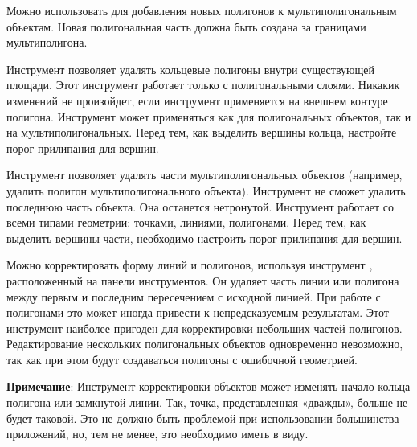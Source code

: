 
Можно использовать 
для добавления новых полигонов к мультиполигональным объектам. Новая
полигональная часть должна быть создана за границами мультиполигона.



Инструмент  позволяет удалять
кольцевые полигоны внутри существующей площади. Этот инструмент работает
только с полигональными слоями. Никакик изменений не произойдет, если
инструмент применяется на внешнем контуре полигона. Инструмент может
применяться как для полигональных объектов, так и на мультиполигональных.
Перед тем, как выделить вершины кольца, настройте порог прилипания для вершин.



Инструмент  позволяет удалять
части мультиполигональных объектов (например, удалить полигон
мультиполигонального объекта). Инструмент не сможет удалить последнюю часть
объекта. Она останется нетронутой. Инструмент работает со всеми типами
геометрии: точками, линиями, полигонами. Перед тем, как выделить вершины
части, необходимо настроить порог прилипания для вершин.


Можно корректировать форму линий и полигонов, используя инструмент
, расположенный на
панели инструментов. Он удаляет часть линии или полигона между первым и
последним пересечением с исходной линией. При работе с полигонами это
может иногда привести к непредсказуемым результатам. Этот инструмент
наиболее пригоден для корректировки небольших частей полигонов. Редактирование
нескольких  полигональных объектов одновременно невозможно, так как при этом
будут создаваться полигоны с ошибочной геометрией.

\textbf{Примечание}: Инструмент корректировки объектов может изменять начало
кольца полигона или замкнутой линии. Так, точка, представленная «дважды»,
больше не будет таковой. Это не должно быть проблемой при использовании
большинства приложений, но, тем не менее, это необходимо иметь в виду.


